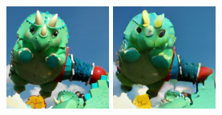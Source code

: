 \begin{figure}[h]
    
    \vspace{10pt}
    
    \begin{minipage}{0.15\textwidth}
        \centering
        \includegraphics[width=\linewidth]{material/origin/40.png}
    \end{minipage}
    \begin{minipage}{0.15\textwidth}
        \centering
        \includegraphics[width=\linewidth]{material/vq/40.png}

\end{minipage}
\end{figure}
